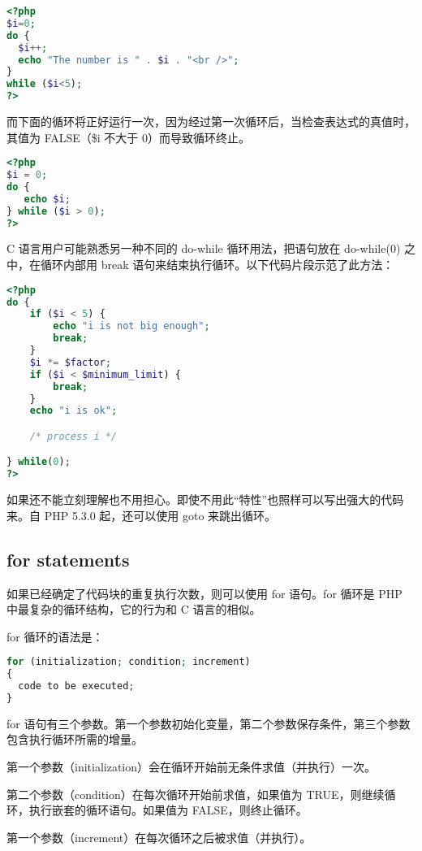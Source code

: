 \begin{lstlisting}[language=PHP]
<?php 
$i=0;
do {
  $i++;
  echo "The number is " . $i . "<br />";
}
while ($i<5);
?>
\end{lstlisting}

而下面的循环将正好运行一次，因为经过第一次循环后，当检查表达式的真值时，其值为 FALSE（\$i 不大于 0）而导致循环终止。

\begin{lstlisting}[language=PHP]
<?php
$i = 0;
do {
   echo $i;
} while ($i > 0);
?>
\end{lstlisting}


C 语言用户可能熟悉另一种不同的 do-while 循环用法，把语句放在 do-while(0) 之中，在循环内部用 break 语句来结束执行循环。以下代码片段示范了此方法：


\begin{lstlisting}[language=PHP]
<?php
do {
    if ($i < 5) {
        echo "i is not big enough";
        break;
    }
    $i *= $factor;
    if ($i < $minimum_limit) {
        break;
    }
    echo "i is ok";

    /* process i */

} while(0);
?>
\end{lstlisting}

如果还不能立刻理解也不用担心。即使不用此“特性”也照样可以写出强大的代码来。自 PHP 5.3.0 起，还可以使用 goto 来跳出循环。


\subsection{for statements}

如果已经确定了代码块的重复执行次数，则可以使用 for 语句。for 循环是 PHP 中最复杂的循环结构，它的行为和 C 语言的相似。 

for 循环的语法是：




\begin{lstlisting}[language=PHP]
for (initialization; condition; increment)
{
  code to be executed;
}
\end{lstlisting}




for 语句有三个参数。第一个参数初始化变量，第二个参数保存条件，第三个参数包含执行循环所需的增量。

\begin{compactitem}
\item 第一个参数（initialization）会在循环开始前无条件求值（并执行）一次。
\item 第二个参数（condition）在每次循环开始前求值，如果值为 TRUE，则继续循环，执行嵌套的循环语句。如果值为 FALSE，则终止循环。
\item 第一个参数（increment）在每次循环之后被求值（并执行）。
\end{compactitem}





